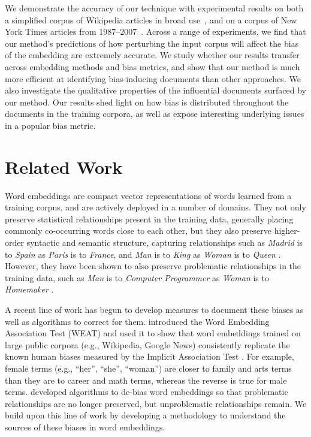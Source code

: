 \documentclass{article}
\begin{document}

We demonstrate the accuracy of our technique with experimental results on both a simplified corpus of Wikipedia articles in broad use~\cite{Simplewiki}, and on a corpus of New York Times articles from 1987--2007~\cite{NewYorkTimes}. 
Across a range of experiments, we find that our method's predictions of how perturbing the input corpus will affect the bias of the embedding are extremely accurate. We study whether our results transfer across embedding methods and bias metrics, and show that our method is much more efficient at identifying bias-inducing documents than other approaches.
We also investigate the qualitative properties of the influential documents surfaced by our method. Our results shed light on how bias is distributed throughout the documents in the training corpora, as well as expose interesting underlying issues in a popular bias metric.


\section{Related Work}
Word embeddings are compact vector representations of words learned from a training corpus, and are actively deployed in a number of domains. They not only preserve statistical relationships present in the training data, generally placing commonly co-occurring words close to each other, but they also preserve higher-order syntactic and semantic structure, capturing relationships such as \textit{Madrid} is to \textit{Spain} as \textit{Paris} is to \textit{France}, and \textit{Man} is to \textit{King} as \textit{Woman} is to \textit{Queen} \cite{Mik13}. However, they have been shown to also preserve problematic relationships in the training data, such as \textit{Man} is to \textit{Computer Programmer} as \textit{Woman} is to \textit{Homemaker} \cite{Homemaker}.

A recent line of work has begun to develop measures to document these biases as well as algorithms to correct for them. 
\citet{WEAT} introduced the Word Embedding Association Test (WEAT) and used it to show that word embeddings trained on large public corpora (e.g., Wikipedia, Google News) consistently replicate the known human biases measured by the Implicit Association Test \cite{IAT98}.
For example, female terms (e.g., ``her'', ``she'', ``woman'') are closer to family and arts terms than they are to career and math terms, whereas the reverse is true for male terms. 
\citet{Homemaker} developed algorithms to de-bias word embeddings so that problematic relationships are no longer preserved, but unproblematic relationships remain.
We build upon this line of work by developing a methodology to understand the sources of these biases in word embeddings.
\end{document}
